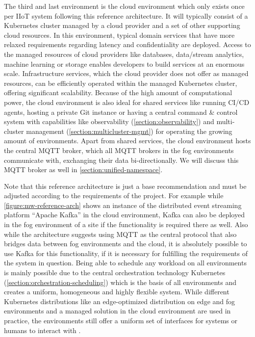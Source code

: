     The third and last environment is the cloud environment which only exists once per IIoT system following this reference architecture. It will typically consist of a Kubernetes cluster managed by a cloud provider and a set of other supporting cloud resources. In this environment, typical domain services that have more relaxed requirements regarding latency and confidentiality are deployed. Access to the managed resources of cloud providers like databases, data/stream analytics, machine learning or storage enables developers to build services at an enormous scale. 
    Infrastructure services, which the cloud provider does not offer as managed resources, can be efficiently operated within the managed Kubernetes cluster, offering significant scalability. Because of the high amount of computational power, the cloud environment is also ideal for shared services like running CI/CD agents, hosting a private Git instance or having a central command \& control system with capabilities like observability (\autoref{section:observability}) and multi-cluster management (\autoref{section:multicluster-mgmt}) for operating the growing amount of environments. Apart from shared services, the cloud environment hosts the central MQTT broker, which all MQTT brokers in the fog environments communicate with, exchanging their data bi-directionally. We will discuss this MQTT broker as well in \autoref{section:unified-namespace}. \newline

    Note that this reference architecture is just a base recommendation and must be adjusted according to the requirements of the project. For example while \autoref{figure:mw-reference-arch} shows an instance of the distributed event streaming platform ``Apache Kafka'' in the cloud environment, Kafka can also be deployed in the fog environment of a site if the functionality is required there as well. Also while the architecture suggests using MQTT as the central protocol that also bridges data between fog environments and the cloud, it is absolutely possible to use Kafka for this functionality, if it is necessary for fulfilling the requirements of the system in question. Being able to schedule any workload on all environments is mainly possible due to the central orchestration technology Kubernetes (\autoref{section:orchestration-scheduling}) which is the basis of all environments and creates a uniform, homogeneous and highly flexible system. While different Kubernetes distributions like an edge-optimized distribution on edge and fog environments and a managed solution in the cloud environment are used in practice, the environments still offer a uniform set of interfaces for systems or humans to interact with \cite{building_iiot}. \newpage
